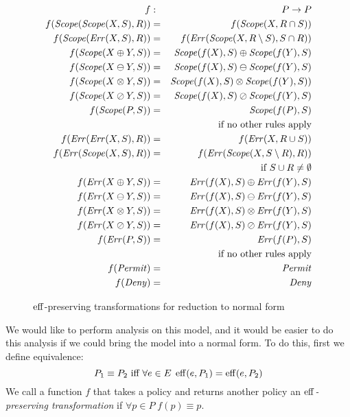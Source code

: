 \begin{figure}[t]
\centering
\begin{footnotesize}
\begin{eqnarray*}
  f & : & P   \rightarrow  P \\
  f (\text{\textit{Scope}} (\text{\textit{Scope}} (X, S), R))  & = & f (\text{\textit{Scope}} (X, R \cap S)) \\
  f (\text{\textit{Scope}} (\text{\textit{Err}} (X, S), R)) & = & f (\text{\textit{Err}} (\text{\textit{Scope}} (X, R \setminus S), 
  S \cap R)) \\
  f (\text{\textit{Scope}} (X \oplus Y, S)) & = & \text{\textit{Scope}} (f (X), S) \oplus 
  \text{\textit{Scope}} (f (Y), S) \\
  f (\text{\textit{Scope}} (X \ominus Y, S)) & = & \text{\textit{Scope}} (f (X), S) \ominus 
  \text{\textit{Scope}} (f (Y), S) \\
  f (\text{\textit{Scope}} (X \otimes Y, S)) & = & \text{\textit{Scope}} (f (X), S) \otimes 
  \text{\textit{Scope}} (f (Y), S)) \\
  f (\text{\textit{Scope}} (X \oslash Y, S)) & = & \text{\textit{Scope}} (f (X), S) \oslash 
  \text{\textit{Scope}} (f (Y), S) \\
  f (\text{\textit{Scope}} (P, S)) & = & \text{\textit{Scope}} (f (P), S) \\
  && \quad \text{if no other rules apply} \\
  f (\text{\textit{Err}} (\text{\textit{Err}} (X, S), R)) & = & f (\text{\textit{Err}} (X, R \cup S)) \\
  f (\text{\textit{Err}} (\text{\textit{Scope}} (X, S), R)) & = & f (\text{\textit{Err}} (\text{\textit{Scope}} (X, S \setminus R), R)) \\
  && \quad \text{if $S \cup R \neq \emptyset$} \\
  f (\text{\textit{Err}} (X \oplus Y, S))  & = &  \text{\textit{Err}} (f (X), S) \oplus \text{\textit{Err}} (f (Y), S) \\
  f (\text{\textit{Err}} (X \ominus Y, S)) & = &  \text{\textit{Err}} (f (X), S) \ominus \text{\textit{Err}} (f (Y), S) \\
  f (\text{\textit{Err}} (X \otimes Y, S)) & = &  \text{\textit{Err}} (f (X), S) \otimes \text{\textit{Err}} (f (Y), S) \\
  f (\text{\textit{Err}} (X \oslash Y, S)) & = &  \text{\textit{Err}} (f (X), S) \oslash \text{\textit{Err}} (f (Y), S) \\
  f (\text{\textit{Err}} (P, S)) & = & \text{\textit{Err}} (f (P), S) \\
  && \quad \text{if no other rules apply} \\
  f (\text{\textit{Permit}}) & = & \text{\textit{Permit}} \\
  f (\text{\textit{Deny}}) & = & \text{\textit{Deny}}
\end{eqnarray*}
\end{footnotesize}
\caption{$\operatorname{eff}$-preserving transformations for reduction to normal form}
\label{fig:1streduction}
\end{figure}

We would like to perform analysis on this model, and it would be
easier to do this analysis if we could bring the model into a normal
form.  To do this, first we define equivalence:
\begin{equation*}
  P_1 \equiv P_2 \text{ iff } \forall e \in E \; \operatorname{eff} (e, P_1) = \operatorname{eff} (e, P_2)
\end{equation*}
We call a function $f$ that takes a policy and returns another
policy an \emph{$\operatorname{eff}$-preserving transformation} if $\forall p \in P
\; f (p) \equiv p$.

